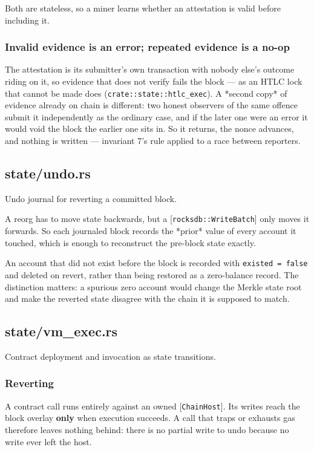 \documentclass[11pt,a4paper]{article}
\begin{document}
Both are stateless, so a miner learns whether an attestation is valid
before including it.

\subsubsection{Invalid evidence is an error; repeated evidence is a no-op}

The attestation is its submitter's own transaction with nobody else's
outcome riding on it, so evidence that does not verify fails the block —
as an HTLC lock that cannot be made does (\texttt{crate::state::htlc\_exec}). A
*second copy* of evidence already on chain is different: two honest
observers of the same offence submit it independently as the ordinary case,
and if the later one were an error it would void the block the earlier one
sits in. So it returns, the nonce advances, and nothing is written —
invariant 7's rule applied to a race between reporters.

\subsection{state/undo.rs}
Undo journal for reverting a committed block.

A reorg has to move state backwards, but a [\texttt{rocksdb::WriteBatch}] only
moves it forwards. So each journaled block records the *prior* value of
every account it touched, which is enough to reconstruct the pre-block state
exactly.

An account that did not exist before the block is recorded with
\texttt{existed = false} and deleted on revert, rather than being restored as a
zero-balance record. The distinction matters: a spurious zero account would
change the Merkle state root and make the reverted state disagree with the
chain it is supposed to match.

\subsection{state/vm\_exec.rs}
Contract deployment and invocation as state transitions.

\subsubsection{Reverting}

A contract call runs entirely against an owned [\texttt{ChainHost}]. Its writes
reach the block overlay \textbf{only} when execution succeeds. A call that traps
or exhausts gas therefore leaves nothing behind: there is no partial write to
undo because no write ever left the host.
\end{document}
